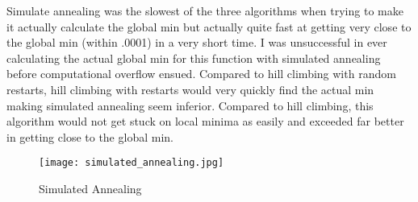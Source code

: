 \documentclass{article}
\begin{document}
    Simulate annealing was the slowest of the three algorithms when trying to make it actually calculate the global min but actually quite fast at getting very close to the global min (within .0001) in a very short time. I was unsuccessful in ever calculating the actual global min for this function with simulated annealing before computational overflow ensued. Compared to hill climbing with random restarts, hill climbing with restarts would very quickly find the actual min making simulated annealing seem inferior. Compared to hill climbing, this algorithm would not get stuck on local minima as easily and exceeded far better in getting close to the global min.
    
    \begin{figure}[hb!]
        \centering
        \texttt{[image: simulated\_annealing.jpg]}
        \caption{Simulated Annealing}
        \label{fig:simulatedannealing}
    \end{figure}
    
    \clearpage
\end{document}
